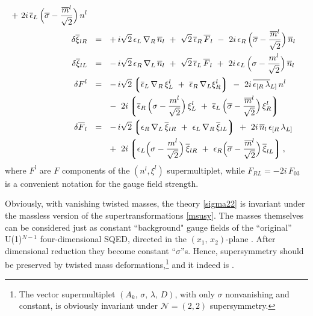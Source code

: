 \documentclass[12pt]{article}
\newcommand{\ntwot}{${\mathcal N}= \left(2,2\right) $ }
\newcommand{\ov}{\overline}
\newcommand{\lgr}{\left\lgroup}
\newcommand{\rgr}{\right\rgroup}
\newcommand{\eer}{\epsilon_R}
\newcommand{\eel}{\epsilon_L}
\newcommand{\beer}{\ov{\epsilon}{}_R}
\newcommand{\beel}{\ov{\epsilon}{}_L}
\begin{document}
\begin{align}
     ~+~ 2i\, \beel\, \Bigl(\ov{\sigma} - \frac{\ov{m}{}^l}{\sqrt{2}}\Bigr)\, n^l
     \\
%
\notag
  \delta\ov{\xi}{}_{lR} & ~~=~~
     +\, i\sqrt{2}\, \eel\, \nabla_R\, \ov{n}{}_l 
     ~+~ \sqrt{2}\, \beer\, \ov{F}{}_l 
     ~-~ 2i\, \eer\, \Bigl(\ov{\sigma} - \frac{\ov{m}{}^l}{\sqrt{2}}\Bigr)\, \ov{n}{}_l
     \\
%
\notag
  \delta\ov{\xi}{}_{lL} & ~~=~~
     -\, i\sqrt{2}\, \eer\, \nabla_L\, \ov{n}{}_l
     ~+~ \sqrt{2}\, \beel\, \ov{F}{}_l
     ~+~ 2i\, \eel\, \Bigl(\sigma - \frac{m^l}{\sqrt{2}}\Bigr)\, \ov{n}{}_l
     \\
%
\notag
  \delta F^l & ~~=~~
     -\,i\sqrt{2} \lgr \beel\, \nabla_R\, \xi_L^l ~+~ \beer\, \nabla_L \xi_R^l \rgr
     ~-~ 2i\, \ov{\epsilon_{[R}\, \lambda}{}_{L]}\, n^l
     \\
\notag
     & \phantom{~~=~~}
     ~-~ 2i \lgr \beer\, \Bigl(\sigma - \frac{m^l}{\sqrt{2}}\Bigr)\, \xi_L^l 
             ~+~ \beel\, \Bigl(\ov{\sigma} - \frac{\ov{m}{}^l}{\sqrt{2}}\Bigr)\, \xi_R^l \rgr 
     \\
%
\notag
  \delta \ov{F}{}_l & ~~=~~
     -\,i\sqrt{2} \lgr \eer\, \nabla_L\, \ov{\xi}{}_{lR} ~+~ 
                       \eel\, \nabla_R\, \ov{\xi}{}_{lL} \rgr
     ~+~ 2i\,\ov{n}{}_l\, \epsilon_{[R}\, \lambda_{L]} 
     \\
\notag
     & \phantom{~~=~~}
     ~+~ 2i \lgr \eel \Bigl(\sigma - \frac{m^l}{\sqrt{2}}\Bigr)\, \ov{\xi}{}_{lR} 
             ~+~ \eer \Bigl(\ov{\sigma} - \frac{\ov{m}{}^l}{\sqrt{2}}\Bigr)\, 
                            \ov{\xi}_{lL} \rgr ,
\end{align}
where $F^l$ are $F$ components of the $(n^l,\xi^l)$
supermultiplet, while $F_{RL}=-2i\,F_{03}$ is a
convenient notation for the gauge field
strength.

	Obviously, with vanishing twisted masses, the theory \eqref{sigma22} is invariant
	under the massless version of the supertransformations \eqref{msusy}.
	The masses themselves can be considered just as constant ``background"
	gauge fields of
	the ``original'' U(1)$^{N-1}$  
	four-dimensional SQED, directed in the $ (x_1,\, x_2) $-plane \cite{HaHo,Dorey}.
	After dimensional reduction they become constant ``$\sigma$''s.
	Hence, supersymmetry should be preserved by twisted mass deformations,\footnote{
The vector supermultiplet $(A_k,\,\sigma,\,\lambda,\,D)$, with only 
          $ \sigma $ nonvanishing and constant, is obviously invariant under \ntwot supersymmetry.}
	and it indeed is \cite{twisted}.
\end{document}
